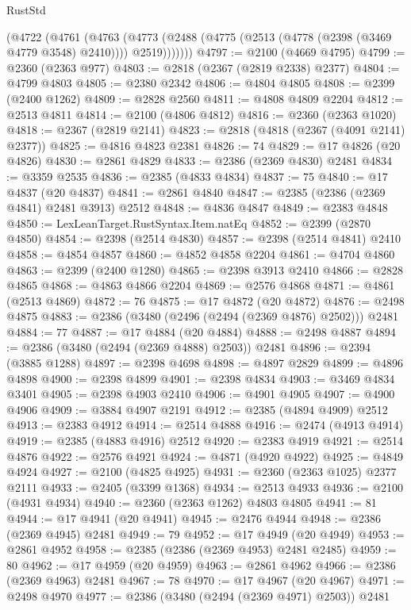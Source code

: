 \begin{lexlean}{RustStd}
\begin{coremodule}
{\begin{coremodule}
{{{{{{{{{{{{{{{{{{{{{{{{{{{{{{{{{{{{{{{{{{{{{{{{{{        (@4722
          (@4761
            (@4763
              (@4773 (@2488 (@4775 (@2513 (@4778 (@2398 (@3469 @4779 @3548) @2410)))) @2519)))))))
@4797 := @2100 (@4669 @4795)
@4799 := @2360 (@2363 @977)
@4803 := @2818 (@2367 (@2819 @2338) @2377)
@4804 := @4799 @4803
@4805 := @2380 @2342
@4806 := @4804 @4805
@4808 := @2399 (@2400 @1262)
@4809 := @2828 @2560
@4811 := @4808 @4809 @2204
@4812 := @2513 @4811
@4814 := @2100 (@4806 @4812)
@4816 := @2360 (@2363 @1020)
@4818 := @2367 (@2819 @2141)
@4823 := @2818 (@4818 (@2367 (@4091 @2141) @2377))
@4825 := @4816 @4823 @2381
@4826 := 74
@4829 := @17 @4826 (@20 @4826)
@4830 := @2861 @4829
@4833 := @2386 (@2369 @4830) @2481
@4834 := @3359 @2535
@4836 := @2385 (@4833 @4834)
@4837 := 75
@4840 := @17 @4837 (@20 @4837)
@4841 := @2861 @4840
@4847 := @2385 (@2386 (@2369 @4841) @2481 @3913) @2512
@4848 := @4836 @4847
@4849 := @2383 @4848
@4850 := LexLeanTarget.RustSyntax.Item.natEq
@4852 := @2399 (@2870 @4850)
@4854 := @2398 (@2514 @4830)
@4857 := @2398 (@2514 @4841) @2410
@4858 := @4854 @4857
@4860 := @4852 @4858 @2204
@4861 := @4704 @4860
@4863 := @2399 (@2400 @1280)
@4865 := @2398 @3913 @2410
@4866 := @2828 @4865
@4868 := @4863 @4866 @2204
@4869 := @2576 @4868
@4871 := @4861 (@2513 @4869)
@4872 := 76
@4875 := @17 @4872 (@20 @4872)
@4876 := @2498 @4875
@4883 := @2386 (@3480 (@2496 (@2494 (@2369 @4876) @2502))) @2481
@4884 := 77
@4887 := @17 @4884 (@20 @4884)
@4888 := @2498 @4887
@4894 := @2386 (@3480 (@2494 (@2369 @4888) @2503)) @2481
@4896 := @2394 (@3885 @1288)
@4897 := @2398 @4698
@4898 := @4897 @2829
@4899 := @4896 @4898
@4900 := @2398 @4899
@4901 := @2398 @4834
@4903 := @3469 @4834 @3401
@4905 := @2398 @4903 @2410
@4906 := @4901 @4905
@4907 := @4900 @4906
@4909 := @3884 @4907 @2191
@4912 := @2385 (@4894 @4909) @2512
@4913 := @2383 @4912
@4914 := @2514 @4888
@4916 := @2474 (@4913 @4914)
@4919 := @2385 (@4883 @4916) @2512
@4920 := @2383 @4919
@4921 := @2514 @4876
@4922 := @2576 @4921
@4924 := @4871 (@4920 @4922)
@4925 := @4849 @4924
@4927 := @2100 (@4825 @4925)
@4931 := @2360 (@2363 @1025) @2377 @2111
@4933 := @2405 (@3399 @1368)
@4934 := @2513 @4933
@4936 := @2100 (@4931 @4934)
@4940 := @2360 (@2363 @1262) @4803 @4805
@4941 := 81
@4944 := @17 @4941 (@20 @4941)
@4945 := @2476 @4944
@4948 := @2386 (@2369 @4945) @2481
@4949 := 79
@4952 := @17 @4949 (@20 @4949)
@4953 := @2861 @4952
@4958 := @2385 (@2386 (@2369 @4953) @2481 @2485)
@4959 := 80
@4962 := @17 @4959 (@20 @4959)
@4963 := @2861 @4962
@4966 := @2386 (@2369 @4963) @2481
@4967 := 78
@4970 := @17 @4967 (@20 @4967)
@4971 := @2498 @4970
@4977 := @2386 (@3480 (@2494 (@2369 @4971) @2503)) @2481
}}}}}}}}}}}}}}}}}}}}}}}}}}}}}}}}}}}}}}}}}}}}}}}}}}
\end{coremodule}}
\end{coremodule}
\end{lexlean}
